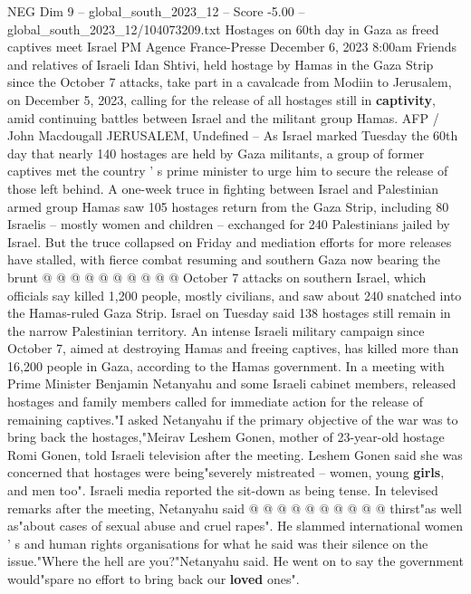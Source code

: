 \begin{textsample}{NEG Dim 9 – global\_south\_2023\_12 – Score -5.00 – global\_south\_2023\_12/104073209.txt}  \label{ex:f9_neg_307}
Hostages on 60th day in Gaza as freed captives meet Israel PM Agence France-Presse December 6, 2023 8:00am Friends and relatives of Israeli Idan Shtivi, held hostage by Hamas in the Gaza Strip since the October 7 attacks, take part in a cavalcade from Modiin to Jerusalem, on December 5, 2023, calling for the release of all hostages still in \textbf{captivity}, amid continuing battles between Israel and the militant group Hamas.
AFP / John Macdougall JERUSALEM, Undefined -- As Israel marked Tuesday the 60th day that nearly 140 hostages are held by Gaza militants, a group of former captives met the country ' s prime minister to urge him to secure the release of those left behind.
A one-week truce in fighting between Israel and Palestinian armed group Hamas saw 105 hostages return from the Gaza Strip, including 80 Israelis -- mostly women and children -- exchanged for 240 Palestinians jailed by Israel.
But the truce collapsed on Friday and mediation efforts for more releases have stalled, with fierce combat resuming and southern Gaza now bearing the brunt @ @ @ @ @ @ @ @ @ @ October 7 attacks on southern Israel, which officials say killed 1,200 people, mostly civilians, and saw about 240 snatched into the Hamas-ruled Gaza Strip.
Israel on Tuesday said 138 hostages still remain in the narrow Palestinian territory.
An intense Israeli military campaign since October 7, aimed at destroying Hamas and freeing captives, has killed more than 16,200 people in Gaza, according to the Hamas government.
In a meeting with Prime Minister Benjamin Netanyahu and some Israeli cabinet members, released hostages and family members called for immediate action for the release of remaining captives."I asked Netanyahu if the primary objective of the war was to bring back the hostages,"Meirav Leshem Gonen, mother of 23-year-old hostage Romi Gonen, told Israeli television after the meeting.
Leshem Gonen said she was concerned that hostages were being"severely mistreated -- women, young \textbf{girls}, and men too".
Israeli media reported the sit-down as being tense.
In televised remarks after the meeting, Netanyahu said @ @ @ @ @ @ @ @ @ @ thirst"as well as"about cases of sexual abuse and cruel rapes".
He slammed international women ' s and human rights organisations for what he said was their silence on the issue."Where the hell are you?"Netanyahu said.
He went on to say the government would"spare no effort to bring back our \textbf{loved} ones".

\end{textsample}
